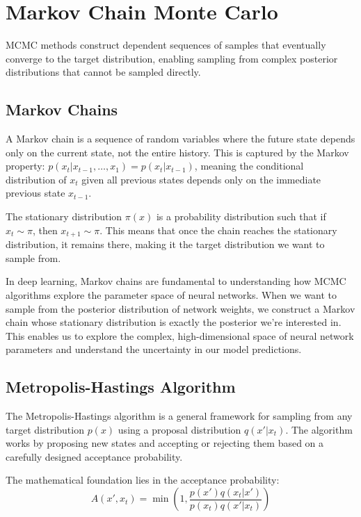 
\section{Markov Chain Monte Carlo }
\label{sec:mcmc}

MCMC methods construct dependent sequences of samples that eventually converge to the target distribution, enabling sampling from complex posterior distributions that cannot be sampled directly.

\subsection{Markov Chains}

A Markov chain is a sequence of random variables where the future state depends only on the current state, not the entire history. This is captured by the Markov property: $p(x_t|x_{t-1}, \ldots, x_1) = p(x_t|x_{t-1})$, meaning the conditional distribution of $x_t$ given all previous states depends only on the immediate previous state $x_{t-1}$.

The stationary distribution $\pi(x)$ is a probability distribution such that if $x_t \sim \pi$, then $x_{t+1} \sim \pi$. This means that once the chain reaches the stationary distribution, it remains there, making it the target distribution we want to sample from.

In deep learning, Markov chains are fundamental to understanding how MCMC algorithms explore the parameter space of neural networks. When we want to sample from the posterior distribution of network weights, we construct a Markov chain whose stationary distribution is exactly the posterior we're interested in. This enables us to explore the complex, high-dimensional space of neural network parameters and understand the uncertainty in our model predictions.

\subsection{Metropolis-Hastings Algorithm}

The Metropolis-Hastings algorithm is a general framework for sampling from any target distribution $p(x)$ using a proposal distribution $q(x'|x_t)$. The algorithm works by proposing new states and accepting or rejecting them based on a carefully designed acceptance probability.

The mathematical foundation lies in the acceptance probability:
\begin{equation}
A(x', x_t) = \min\left(1, \frac{p(x')q(x_t|x')}{p(x_t)q(x'|x_t)}\right)
\end{equation}


